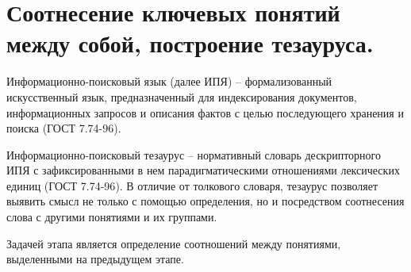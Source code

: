 
\pagebreak


\section{Соотнесение ключевых понятий между собой, построение тезауруса.}

Информационно-поисковый язык (далее ИПЯ) -- формализованный искусственный язык, предназначенный для
индексирования документов, информационных запросов и описания фактов с целью последующего хранения
и поиска (ГОСТ 7.74-96\cite{gost77496}).


Информационно-поисковый тезаурус -- нормативный словарь дескрипторного ИПЯ с зафиксированными
в нем парадигматическими отношениями лексических единиц (ГОСТ 7.74-96\cite{gost77496}).
В отличие от толкового словаря, тезаурус позволяет выявить смысл не только с помощью определения,
но и посредством соотнесения слова с другими понятиями и их группами.


Задачей этапа является определение соотношений между понятиями, выделенными на предыдущем этапе.

\begin{figure}[ht]
    \begin{center}
    \end {center}\label{fig:thesaurus_img}
\end {figure}
